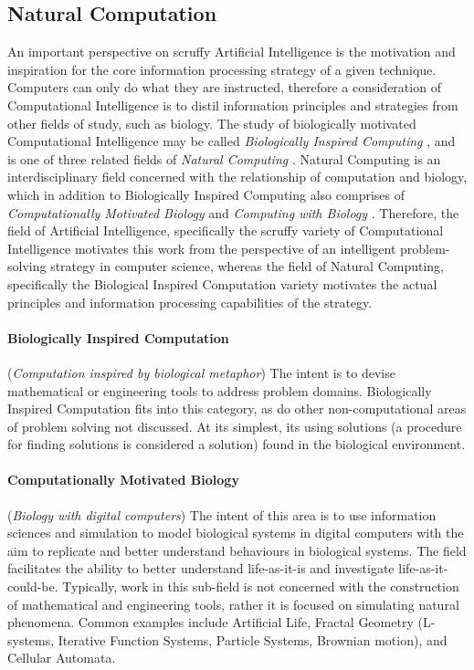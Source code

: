\subsection{Natural Computation}
An important perspective on scruffy Artificial Intelligence is the motivation and inspiration for the core information processing strategy of a given technique. Computers can only do what they are instructed, therefore a consideration of Computational Intelligence is to distil information principles and strategies from other fields of study, such as biology. The study of biologically motivated Computational Intelligence may be called \emph{Biologically Inspired Computing} \cite{Castro2005}, and is one of three related fields of \emph{Natural Computing} \cite{Forbes2000, Forbes2004, Paton1994}. Natural Computing is an interdisciplinary field concerned with the relationship of computation and biology, which in addition to Biologically Inspired Computing also comprises of \emph{Computationally Motivated Biology} and \emph{Computing with Biology} \cite{Paun2005, Marrow2000, Aaronson2005}. Therefore, the field of Artificial Intelligence, specifically the scruffy variety of Computational Intelligence motivates this work from the perspective of an intelligent problem-solving strategy in computer science, whereas the field of Natural Computing, specifically the Biological Inspired Computation variety motivates the actual principles and information processing capabilities of the strategy.

\paragraph{Biologically Inspired Computation} (\emph{Computation inspired by biological metaphor}) The intent is to devise mathematical or engineering tools to address problem domains. Biologically Inspired Computation fits into this category, as do other non-computational areas of problem solving not discussed. At its simplest, its using solutions (a procedure for finding solutions is considered a solution) found in the biological environment.
\paragraph{Computationally Motivated Biology} (\emph{Biology with digital computers}) The intent of this area is to use information sciences and simulation to model biological systems in digital computers with the aim to replicate and better understand behaviours in biological systems. The field facilitates the ability to better understand life-as-it-is and investigate life-as-it-could-be. Typically, work in this sub-field is not concerned with the construction of mathematical and engineering tools, rather it is focused on simulating natural phenomena. Common examples include Artificial Life, Fractal Geometry (L-systems, Iterative Function Systems, Particle Systems, Brownian motion), and Cellular Automata.

